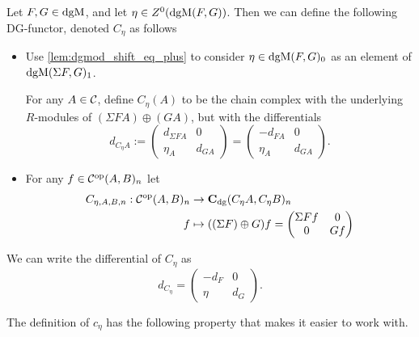 \begin{definition}
    \label{def:dgm_cone}
    Let \( F, G \in \operatorname{dgM} \), and let \( \eta \in Z^0(\operatorname{dgM}(F, G)) \). Then we can define the following DG-functor, denoted \( C_{\eta} \) as follows
    \begin{itemize}
        \item {
            Use \autoref{lem:dgmod_shift_eq_plus} to consider \( \eta \in \operatorname{dgM}(F, G)_0 \) as an element of \( \operatorname{dgM}(\Sigma F, G)_1 \).

            For any \( A \in {\mathcal{C}} \), define \( C_{\eta}(A) \) to be the chain complex with the underlying \( R \)-modules of \( (\Sigma F A) \oplus (G A) \), but with the differentials
            \[
                d_{C_{\eta}A} :=
                \begin{pmatrix}
                    d_{\Sigma F A} & 0 \\
                    \eta_A & d_{GA}
                \end{pmatrix}
                =
                \begin{pmatrix}
                    -d_{F A} & 0 \\
                    \eta_A & d_{GA}
                \end{pmatrix}.
            \]
        }
        \item {
            For any \( f \in {\mathcal{C}}^{\operatorname{op}}(A, B)_n \) let
            \begin{align*}
                C_{\eta, A, B, n}: {\mathcal{C}}^{\operatorname{op}}(A, B)_n &\to \operatorname{\mathbf{C}}_{\operatorname{dg}}(C_{\eta} A, C_{\eta} B)_n \\
                f &\mapsto ((\Sigma F) \oplus G) f = 
                \begin{pmatrix}
                    \Sigma F f & 0 \\
                    0 & G f
                \end{pmatrix}
            \end{align*}
        }
    \end{itemize}
\end{definition}

We can write the differential of \( C_{\eta} \) as
\[
    d_{C_{\eta}} =
    \begin{pmatrix}
        -d_F & 0 \\
        \eta & d_G
    \end{pmatrix}.
\]

The definition of \( c_{\eta} \) has the following property that makes it easier to work with.

